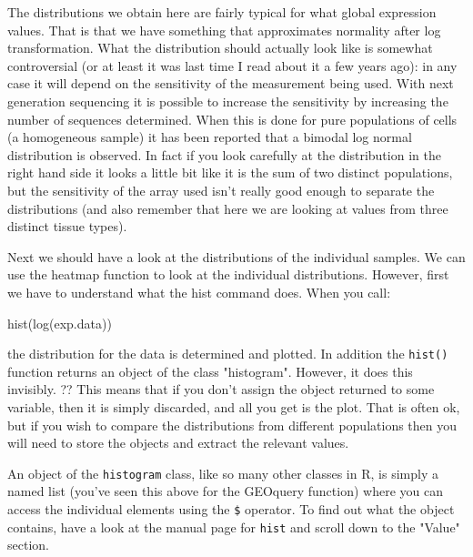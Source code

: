 \documentclass[11pt]{article}
\begin{document}
The distributions we obtain here are fairly typical for what global
expression values. That is that we have something that approximates
normality after log transformation. What the distribution should
actually look like is somewhat controversial (or at least it was
last time I read about it a few years ago): in any case it will depend
on the sensitivity of the measurement being used. With next generation
sequencing it is possible to increase the sensitivity by increasing
the number of sequences determined. When this is done for pure populations
of cells (a homogeneous sample) it has been reported that a bimodal
log normal distribution is observed. In fact if you look carefully at
the distribution in the right hand side it looks a little bit like it
is the sum of two distinct populations, but the sensitivity of the
array used isn't really good enough to separate the distributions
(and also remember that here we are looking at values from three
distinct tissue types).

Next we should have a look at the distributions of the individual
samples. We can use the heatmap function to look at the individual
distributions. However, first we have to understand what the
hist command does. When you call:

\begin{rcode}
  hist(log(exp.data))
\end{rcode}

the distribution for the data is determined and plotted. In addition
the \texttt{hist()} function returns an object of the class "histogram".
However, it does this invisibly. ?? This means that if you don't assign
the object returned to some variable, then it is simply discarded,
and all you get is the plot. That is often ok, but if you wish to 
compare the distributions from different populations then you will
need to store the objects and extract the relevant values.

An object of the \texttt{histogram} class, like so many other classes
in R, is simply a named list (you've seen this above for the GEOquery
function) where you can access the individual elements using the \texttt{\$}
operator. To find out what the object contains, have a look at the 
manual page for \texttt{hist} and scroll down to the "Value" section.
\end{document}
